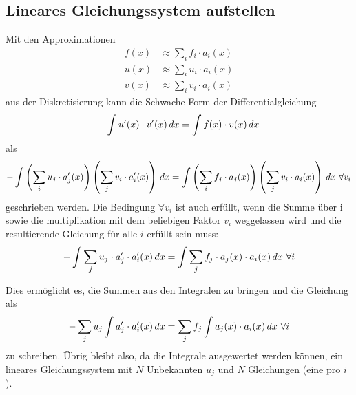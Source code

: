 \subsection{Lineares Gleichungssystem aufstellen\label{fem:1d:lineares_gleichungssystem}}
Mit den Approximationen 
\begin{align}
    f(x) &\approx \sum_i f_i \cdot a_i(x) \\
    u(x) &\approx \sum_i u_i \cdot a_i(x) \\
    v(x) &\approx \sum_i v_i \cdot a_i(x)
\end{align}
aus der Diskretisierung kann die Schwache Form der Differentialgleichung 
\begin{equation}
    - \int u'(x) \cdot v'(x) \, d x = \int f(x) \cdot v(x) \, d x
\end{equation}
als
\begin{equation}
    - \int \left(\sum_i u_j \cdot a'_j(x)\right) \left(\sum_j v_i \cdot a'_i(x)\right) \, d x 
    = \int \left(\sum_i f_j \cdot a_j(x) \right) \left(\sum_j v_i \cdot a_i(x) \right) \, d x 
    \ \forall v_i
\end{equation}
geschrieben werden.
Die Bedingung $\forall v_i$ ist auch erfüllt, wenn die Summe über i sowie die multiplikation mit dem beliebigen Faktor $v_i$ weggelassen wird und die resultierende Gleichung für alle $i$ erfüllt sein muss: %
\begin{equation}
    - \int \sum_j u_j \cdot a'_j \cdot a'_i(x) \, d x = \int \sum_j f_j \cdot a_j(x) \cdot a_i(x) \, d x \ \forall i
\end{equation}

Dies ermöglicht es, die Summen aus den Integralen zu bringen und die Gleichung als
\begin{equation}
    - \sum_j u_j \int a'_j \cdot a'_i(x) \, d x = \sum_j f_j \int a_j(x) \cdot a_i(x) \, d x \ \forall i \label{papers:fem:prinzip1d:finale_gleichung}
\end{equation}
zu schreiben.
Übrig bleibt also, da die Integrale ausgewertet werden können, ein lineares Gleichungssystem mit $N$ Unbekannten $u_j$ und $N$ Gleichungen (eine pro $i$). 


